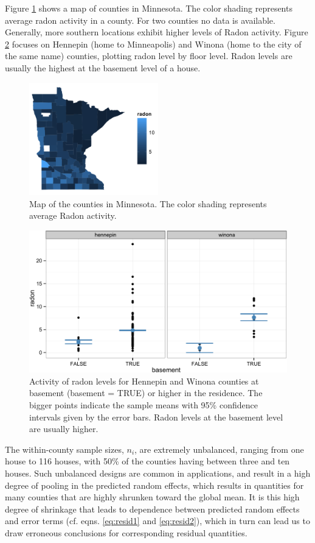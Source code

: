 \documentclass[12pt]{article} %
\begin{document}
Figure \ref{fig:map} shows a map of counties in Minnesota. The color shading represents average radon activity in a county. For two counties no data is available. Generally, more southern locations exhibit higher  levels of Radon activity. Figure \ref{fig:tc} focuses on Hennepin (home to Minneapolis) and Winona (home to the city of the same name) counties, plotting radon level by floor level. Radon levels are usually the highest at the basement level of a house. 
%
\begin{figure}[htb]
\centering
\includegraphics[width=0.5\textwidth]{figures/map.png}
\caption{\label{fig:map} Map of the counties in Minnesota. The color shading represents average Radon activity.}
\end{figure}
%
\begin{figure}[htb]
\centering
\includegraphics[width=0.7\linewidth]{figures/radon-twocounties.pdf}
\caption{\label{fig:tc} Activity of radon levels for Hennepin and Winona counties at basement (basement = TRUE) or higher in the residence. The bigger points indicate the sample means with 95\% confidence intervals  given by the error bars. Radon levels at the basement level are usually higher.}
\end{figure}
%
The within-county sample sizes, $n_i$, are extremely unbalanced, ranging from one house to 116 houses, with 50\% of the counties having between three and ten houses. Such unbalanced designs are common in applications, and result in a high degree of pooling in the predicted random effects, which results in quantities for many counties that are highly shrunken toward the global mean. It is this high degree of shrinkage that leads to dependence between  predicted random effects and error terms (cf. eqns. \ref{eq:resid1} and \ref{eq:resid2}), which in turn can lead us to draw erroneous conclusions for corresponding residual quantities.
\end{document}

